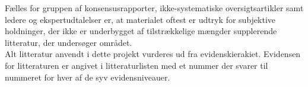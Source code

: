 Fælles for gruppen af konsensusrapporter, ikke-systematiske oversigtsartikler samt ledere og ekspertudtalelser er, at materialet oftest er udtryk for subjektive holdninger, der ikke er underbygget af tilstrækkelige mængder supplerende litteratur, der undersøger området. \citep{metodehaandbogen} \\
Alt litteratur anvendt i dette projekt vurderes ud fra evidenskierakiet. Evidensen for litteraturen er angivet i litteraturlisten med et nummer der svarer til nummeret for hver af de syv evidensniveauer.   